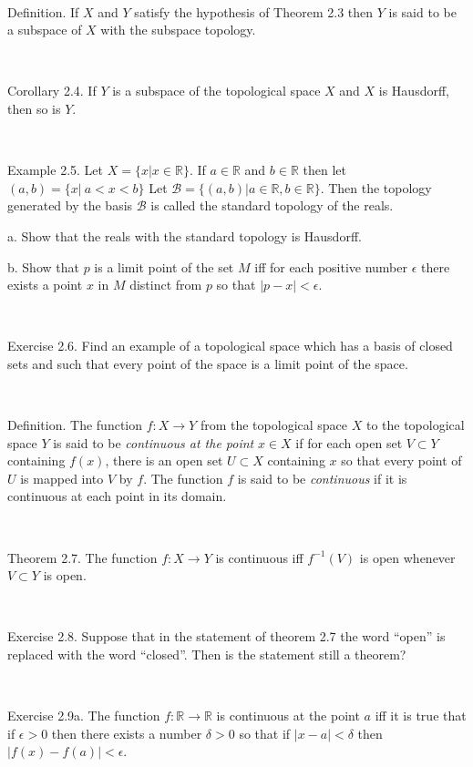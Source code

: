 \documentclass[12pt, std]{article}
\begin{document}
\

Definition. If $X$ and $Y$ satisfy the hypothesis of Theorem 2.3
then $Y$ is said to be a subspace of $X$ with the subspace topology.

\

Corollary 2.4.  If $Y$ is a subspace of the topological space $X$
and $X$ is Hausdorff, then so is $Y$.

\

Example 2.5.  Let $X = \{ x | x \in \mathbb{R} \}$.  If $a \in
\mathbb{R}$ and $b \in \mathbb{R}$ then let $(a,b) = \{ x | \ a < x
< b \}$  Let $\mathcal{B} = \{ (a,b) | a \in \mathbb{R}, b \in
\mathbb{R} \}$. Then the topology generated by the basis
$\mathcal{B}$ is called the standard topology of the reals.

\qquad a.  Show that the reals with the standard topology is
Hausdorff.

\qquad b.  Show that $p$ is a limit point of the set $M$ iff for
each positive number $\epsilon$ there exists a point $x$ in $M$
distinct from $p$ so that $|p-x| < \epsilon $.

\

Exercise 2.6.  Find an example of a topological space which has a
basis of closed sets and such that every point of the space is a
limit point of the space.

\

Definition.  The function $f: X \rightarrow Y$ from the topological
space $X$ to the topological space $Y$ is said to be
\textit{continuous at the point} $x\in X$ if for each open set $V
\subset Y$ containing $f(x)$, there is an open set $U \subset X$
containing $x$ so that every point of $U$ is mapped into $V$ by $f$.
The function $f$ is said to be \textit{continuous} if it is
continuous at each point in its domain.

\

Theorem 2.7. The function $f: X \rightarrow Y$ is continuous iff
$f^{-1}(V)$ is open whenever $V \subset Y$ is open.

\

Exercise 2.8.  Suppose that in the statement of theorem 2.7 the word
``open'' is replaced with the word ``closed''. Then is the statement
still a theorem?

\

Exercise 2.9a.  The function $f: \mathbb{R} \rightarrow \mathbb{R}$
is continuous at the point $a$ iff it is true that if $\epsilon > 0$
then there exists a number $\delta > 0$ so that if $|x-a| < \delta$
then $|f(x) - f(a)| < \epsilon$.
\end{document}
